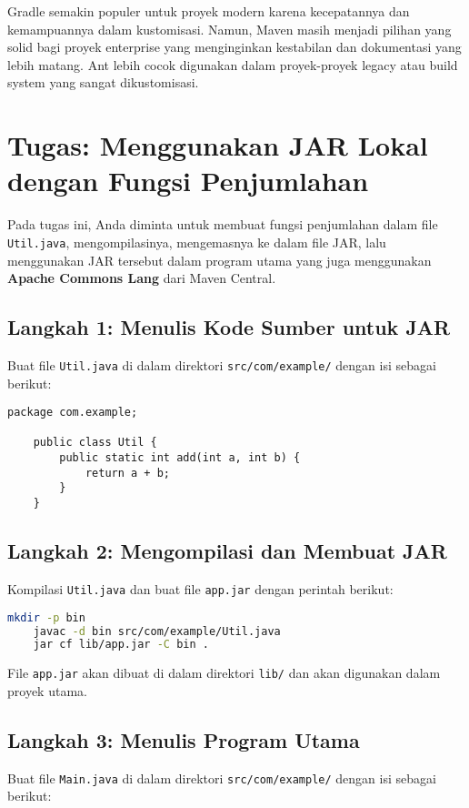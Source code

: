 Gradle semakin populer untuk proyek modern karena kecepatannya dan kemampuannya dalam kustomisasi. Namun, Maven masih menjadi pilihan yang solid bagi proyek enterprise yang menginginkan kestabilan dan dokumentasi yang lebih matang. Ant lebih cocok digunakan dalam proyek-proyek legacy atau build system yang sangat dikustomisasi.




\section{Tugas: Menggunakan JAR Lokal dengan Fungsi Penjumlahan}
Pada tugas ini, Anda diminta untuk membuat fungsi penjumlahan dalam file \texttt{Util.java}, mengompilasinya, mengemasnya ke dalam file JAR, lalu menggunakan JAR tersebut dalam program utama yang juga menggunakan \textbf{Apache Commons Lang} dari Maven Central.

\subsection{Langkah 1: Menulis Kode Sumber untuk JAR}
Buat file \texttt{Util.java} di dalam direktori \texttt{src/com/example/} dengan isi sebagai berikut:

\begin{lstlisting}[style=JavaStyle]
	package com.example;
	
	public class Util {
		public static int add(int a, int b) {
			return a + b;
		}
	}
\end{lstlisting}

\subsection{Langkah 2: Mengompilasi dan Membuat JAR}
Kompilasi \texttt{Util.java} dan buat file \texttt{app.jar} dengan perintah berikut:

\begin{lstlisting}[language=bash]
	mkdir -p bin
	javac -d bin src/com/example/Util.java
	jar cf lib/app.jar -C bin .
\end{lstlisting}

File \texttt{app.jar} akan dibuat di dalam direktori \texttt{lib/} dan akan digunakan dalam proyek utama.

\subsection{Langkah 3: Menulis Program Utama}
Buat file \texttt{Main.java} di dalam direktori \texttt{src/com/example/} dengan isi sebagai berikut:

